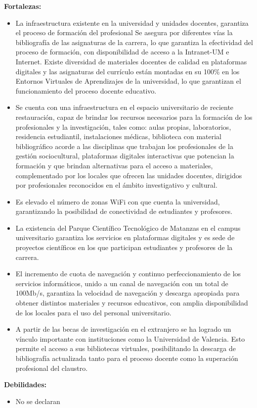 \textbf{Fortalezas:}

\begin{itemize}
	\item La infraestructura existente en la universidad y unidades docentes, garantiza el proceso de formación del profesional Se asegura por diferentes vías la bibliografía de las asignaturas de la carrera, lo que garantiza la efectividad del proceso de formación, con disponibilidad de acceso a la Intranet-UM e Internet. Existe diversidad de materiales docentes de calidad en plataformas digitales y las asignaturas del currículo están montadas en su 100\% en los Entornos Virtuales de Aprendizajes de la universidad, lo que garantizan el funcionamiento del proceso docente educativo.
	\item Se cuenta con una infraestructura en el espacio universitario de reciente restauración, capaz de brindar los recursos necesarios para la formación de los profesionales y la investigación, tales como: aulas propias, laboratorios, residencia estudiantil, instalaciones médicas, biblioteca con material bibliográfico acorde a las disciplinas que trabajan los profesionales de la gestión sociocultural, plataformas digitales interactivas que potencian la formación y que brindan alternativas para el acceso a materiales, complementado por los locales que ofrecen las unidades docentes, dirigidos por profesionales reconocidos en el ámbito investigativo y cultural. 
	\item Es elevado el número de zonas WiFi con que cuenta la universidad, garantizando la posibilidad de conectividad de estudiantes y profesores.
	\item La existencia del Parque Científico Tecnológico de Matanzas en el campus universitario garantiza los servicios en plataformas digitales y es sede de proyectos científicos en los que participan estudiantes y profesores de la carrera.
	\item El incremento de cuota de navegación y continuo perfeccionamiento de los servicios informáticos, unido a un canal de navegación con un total de 100Mb/s, garantiza la velocidad de navegación y descarga apropiada para obtener distintos materiales y recursos educativos, con amplia disponibilidad de los locales para el uso del personal universitario.
	\item A partir de las becas de investigación en el extranjero se ha logrado un vínculo importante con instituciones como la Universidad de Valencia. Esto permite el acceso a sus bibliotecas virtuales, posibilitando la descarga de bibliografía actualizada tanto para el proceso docente como la superación profesional del claustro.
\end{itemize}

\textbf{Debilidades:}
\begin{itemize}
	\item No se declaran
\end{itemize}